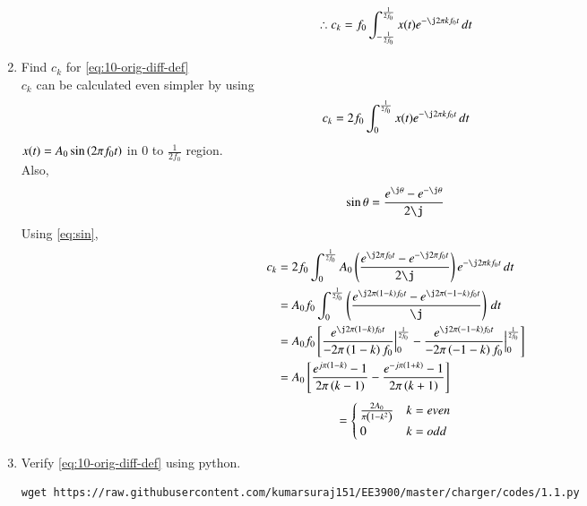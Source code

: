 \documentclass[journal,12pt,twocolumn]{IEEEtran}
\renewcommand\thesection{\arabic{section}}
\begin{document}
\begin{enumerate}[label=\thesection.\arabic*,ref=\thesection.\theenumi]
\begin{align}
  \therefore c_k = f_0\int_{-\frac{1}{2f_0}}^{\frac{1}{2f_0}}x(t)e^{-\j2\pi kf_0 t}\, dt
    \end{align}
	\item Find $c_k$ for 
	\eqref{eq:10-orig-diff-def}\\
	\solution
	$c_k$ can be calculated even simpler by using
	\begin{align}
	c_k = 2f_0\int_{0}^{\frac{1}{2f_0}}x(t)e^{- \j2 \pi kf_0 t}\, dt
	\end{align}
	$x(t)=A_0 \sin\left(2 \pi f_0t\right)$ in 0 to $\frac{1}{2f_0}$ region.\\
Also,
	\begin{align}
	\label{eq:sin}
 \sin \theta  =\frac{e^{\j\theta}-e^{-\j \theta}}{2\j} 
  \end{align}
  Using \eqref{eq:sin},
  \begin{align}
  c_k &= 2f_0\int_{0}^{\frac{1}{2f_0}}A_0 \brak{\frac{e^{\j2\pi f_0t}-e^{-\j 2\pi f_0t}}{2\j}} e^{- \j2 \pi kf_0 t}\,dt\\
  &=A_0f_0\int_{0}^{\frac{1}{2f_0}} \brak{\frac{e^{\j2\pi\brak{1-k} f_0t}-e^{\j 2\pi\brak{-1-k} f_0t}}{\j}}\,dt\\
&=A_0f_0\sbrak{\frac{e^{\j2\pi\brak{1-k} f_0t}}{-2\pi \brak{1-k}f_0}\Big|_0^{\frac{1}{2f_0}} - \frac{e^{\j2\pi\brak{-1-k} f_0t}}{-2\pi \brak{-1-k}f_0}\Big|_0^{\frac{1}{2f_0}}}\\
&=A_0\sbrak{\frac{e^{j\pi\brak{1-k}}-1}{2\pi\brak{k-1}}-\frac{e^{-j\pi\brak{1+k}}-1}{2\pi\brak{k+1}}}
  \end{align}
  \begin{equation}
  \label{eq:ck}
 = \begin{cases}
\frac{2A_0}{\pi\left(1-k^2\right)}&k=even
\\
0&k=odd
\end{cases}
  \end{equation}
\item Verify 
	\eqref{eq:10-orig-diff-def}
	using python.\\
	\solution
\begin{lstlisting}
wget https://raw.githubusercontent.com/kumarsuraj151/EE3900/master/charger/codes/1.1.py
\end{lstlisting}
\begin{figure}[!ht]
	\centering

\end{figure}
\end{enumerate}
\end{document}
